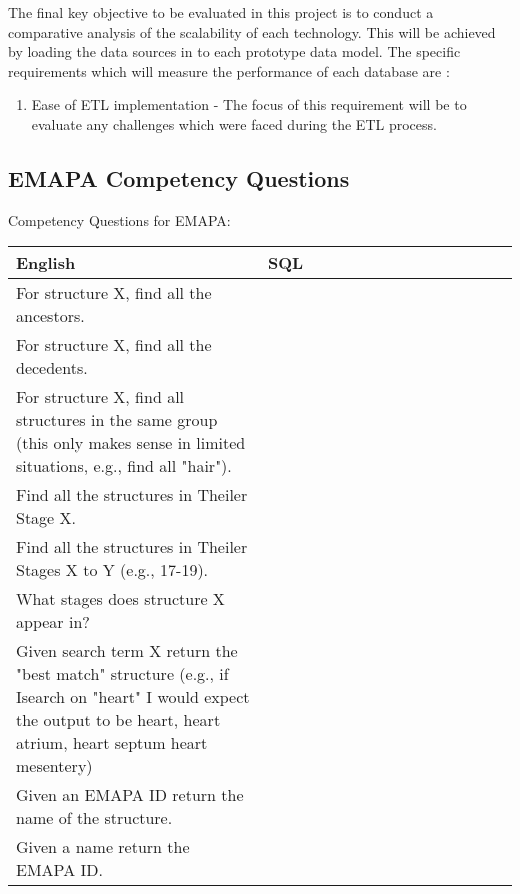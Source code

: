 \parindent 0pt The final key objective to be evaluated in this project is to conduct a comparative analysis of the scalability of each technology. This will be achieved by loading the data sources in to each prototype data model. The specific requirements which will measure the performance of each database are :

\begin{enumerate}
\item Ease of ETL implementation - The focus of this requirement will be to evaluate any challenges which were faced during the ETL process.
\end{enumerate}
\subsection{EMAPA Competency Questions}\label{competency}

Competency Questions for EMAPA:

\begin{center}
    \begin{tabular}{ | p{0.5\linewidth} | p{0.5\linewidth}|}
    \hline
    \textbf{English} & \textbf{SQL} \\ \hline
    For structure X, find all the ancestors. &  \\ \hline
    For structure X, find all the decedents. &  \\ \hline
    For structure X, find all structures in the same group (this only makes sense in limited situations, e.g., find all "hair"). & \\ \hline
    Find all the structures in Theiler Stage X. & \\ \hline
    Find all the structures in Theiler Stages X to Y (e.g., 17-19). &  \\ \hline
    What stages does structure X appear in? & \\ \hline
    Given search term X return the "best match" structure (e.g., if Isearch on "heart" I would expect the output to be heart, heart atrium, heart septum  heart mesentery) & \\ \hline
    Given an EMAPA ID return the name of the structure. &  \\ \hline
    Given a name return the EMAPA ID. &  \\ \hline
    \end{tabular}
\end{center}


